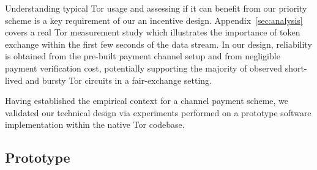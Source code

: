Understanding typical Tor usage and assessing if it can benefit from our priority scheme is a key requirement of our an incentive design.
Appendix~\ref{sec:analysis} covers a real Tor measurement study which illustrates the importance of token exchange within the first few seconds of the data stream.
In our design, reliability is obtained from the pre-built payment channel setup and from negligible payment verification cost, potentially supporting the majority of observed short-lived and bursty Tor circuits in a fair-exchange setting.

Having established the empirical context for a channel payment scheme, we validated our technical design via experiments performed on a prototype software implementation within the native Tor codebase.

\subsection{Prototype}

